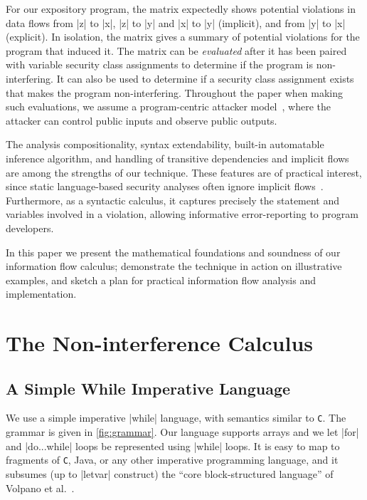 For our expository program, the matrix expectedly shows potential violations in data flows from
\prc|z| to \prc|x|, \prc|z| to \prc|y| and \prc|x| to \prc|y| (implicit), and from \prc|y| to \prc|x| (explicit).
In isolation, the matrix gives a summary of potential violations for the program that induced it.
The matrix can be \emph{evaluated} after it has been paired with variable security class assignments to determine if the program is non-interfering.
It can also be used to determine if a security class assignment exists that makes the program non-interfering.
Throughout the paper when making such evaluations, we assume a program-centric attacker model~\cite{hedin2012}, where the attacker can control public inputs and observe public outputs.

The analysis compositionality, syntax extendability, built-in automatable inference algorithm, and handling of transitive dependencies and implicit flows are among the strengths of our technique.
These features are of practical interest, since static language-based security analyses often ignore implicit flows~\cite[pg.~144]{huang2014}.
Furthermore, as a syntactic calculus, it captures precisely the statement and variables involved in a violation, allowing informative error-reporting to program developers.

In this paper
we present the mathematical foundations and soundness of our information flow calculus;
demonstrate the technique in action on illustrative examples,
and sketch a plan for practical information flow analysis and implementation.

\tocless\section{The Non-interference Calculus}
\label{sec:calculus}

\tocless\subsection{A Simple While Imperative Language}
\label{subsec:language}

We use a simple imperative \textnormal{\prc|while|} language, with semantics similar to \texttt{C}.
The grammar is given in \autoref{fig:grammar}.
Our language supports arrays %
and we let \prc|for| and \prc|do...while| loops be represented using \prc|while| loops.
It is easy to map to fragments of \texttt{C}, Java, or any other imperative programming language, and it subsumes (up to \prc|letvar| construct) the \enquote{core block-structured language} of Volpano et al.~\cite{VolpanoI1996}.


